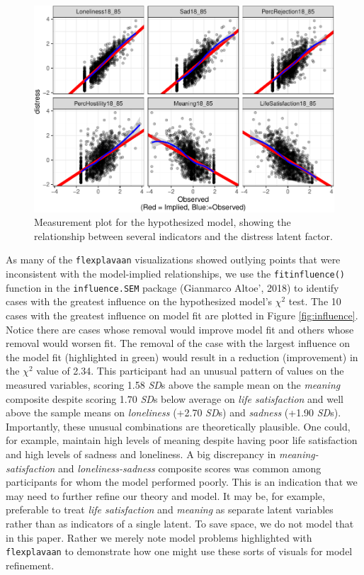 \documentclass[
  english,
  man]{apa6}
\begin{document}
\begin{figure}

{\centering \includegraphics[width=0.8\linewidth]{flexplavaan_draft_files/figure-latex/measurementrealdistress-1} 

}

\caption{Measurement plot for the hypothesized model, showing the relationship between several indicators and the distress latent factor.}\label{fig:measurementrealdistress}
\end{figure}

As many of the \texttt{flexplavaan} visualizations showed outlying points that were inconsistent with the model-implied relationships, we use the \texttt{fitinfluence()} function in the \texttt{influence.SEM} package (Gianmarco Altoe', 2018) to identify cases with the greatest influence on the hypothesized model's \(\chi^2\) test. The 10 cases with the greatest influence on model fit are plotted in Figure \ref{fig:influence}. Notice there are cases whose removal would improve model fit and others whose removal would worsen fit. The removal of the case with the largest influence on the model fit (highlighted in green) would result in a reduction (improvement) in the \(\chi^2\) value of 2.34. This participant had an unusual pattern of values on the measured variables, scoring 1.58 \emph{SD}s above the sample mean on the \emph{meaning} composite despite scoring 1.70 \emph{SD}s below average on \emph{life satisfaction} and well above the sample means on \emph{loneliness} (+2.70 \emph{SD}s) and \emph{sadness} (+1.90 \emph{SD}s). Importantly, these unusual combinations are theoretically plausible. One could, for example, maintain high levels of meaning despite having poor life satisfaction and high levels of sadness and loneliness. A big discrepancy in \emph{meaning-satisfaction} and \emph{loneliness-sadness} composite scores was common among participants for whom the model performed poorly. This is an indication that we may need to further refine our theory and model. It may be, for example, preferable to treat \emph{life satisfaction} and \emph{meaning} as separate latent variables rather than as indicators of a single latent. To save space, we do not model that in this paper. Rather we merely note model problems highlighted with \texttt{flexplavaan} to demonstrate how one might use these sorts of visuals for model refinement.
\end{document}
